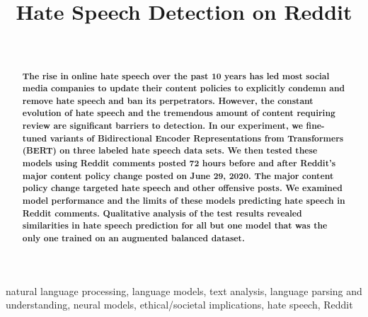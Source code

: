\documentclass[conference]{IEEEtran}
\begin{document}
\title{Hate Speech Detection on Reddit}

\author{
\and
{}
\and
{}
\
}

\maketitle

\begin{abstract}
\textbf{The rise in online hate speech over the past 10 years has led most social media companies to update their content policies to explicitly condemn and remove hate speech and ban its perpetrators. However, the constant evolution of hate speech and the tremendous amount of content requiring review are significant barriers to detection. In our experiment, we fine-tuned variants of Bidirectional Encoder Representations from Transformers (BERT) on three labeled hate speech data sets. We then tested these models using Reddit comments posted 72 hours before and after Reddit's major content policy change posted on June 29, 2020. The major content policy change targeted hate speech and other offensive posts. We examined model performance and the limits of these models predicting hate speech in Reddit comments. Qualitative analysis of the test results revealed similarities in hate speech prediction for all but one model that was the only one trained on an augmented balanced dataset.}
\end{abstract}

\begin{IEEEkeywords}
natural language processing, language models, text analysis, language parsing and understanding, neural models, ethical/societal implications, hate speech, Reddit
\end{IEEEkeywords}
\end{document}
